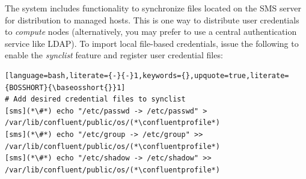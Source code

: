 The \Confluent{} system includes functionality to synchronize files located on the
SMS server for distribution to managed hosts. This is one way to
distribute user credentials to {\em compute} nodes (alternatively, you may
prefer to use a central authentication service like LDAP). To import local file-based
credentials, issue the following to enable the {\em synclist} feature and
register user credential files:

\begin{lstlisting}[language=bash,literate={-}{-}1,keywords={},upquote=true,literate={BOSSHORT}{\baseosshort{}}1]
# Add desired credential files to synclist
[sms](*\#*) echo "/etc/passwd -> /etc/passwd" > /var/lib/confluent/public/os/(*\confluentprofile*)
[sms](*\#*) echo "/etc/group -> /etc/group" >> /var/lib/confluent/public/os/(*\confluentprofile*)
[sms](*\#*) echo "/etc/shadow -> /etc/shadow" >> /var/lib/confluent/public/os/(*\confluentprofile*)
\end{lstlisting}
